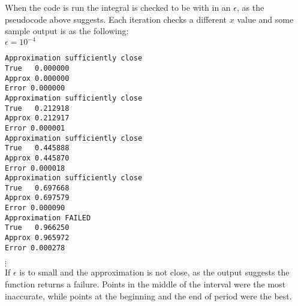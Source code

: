 \documentclass[]{article}
\begin{document}
When the code is run the integral is checked to be with in an $ \epsilon $, as the pseudocode above suggests. Each iteration checks a different $ x $ value and some sample output is as the following: \\
$ \epsilon = 10^{-4} $
\hline
\begin{verbatim}
Approximation sufficiently close 
True   0.000000 
Approx 0.000000
Error 0.000000
Approximation sufficiently close 
True   0.212918 
Approx 0.212917
Error 0.000001
Approximation sufficiently close 
True   0.445888 
Approx 0.445870
Error 0.000018
Approximation sufficiently close 
True   0.697668 
Approx 0.697579
Error 0.000090
Approximation FAILED
True   0.966250 
Approx 0.965972
Error 0.000278
\end{verbatim}
\begin{flushleft}
$ \vdots $ \\
\hline 
\vspace{.5cm}
If $ \epsilon $ is to small and the approximation is not close, as the output suggests the function returns a failure. Points in the middle of the interval were the most inaccurate, while points at the beginning and the end of period were the best. 
\end{flushleft}
\end{document}
